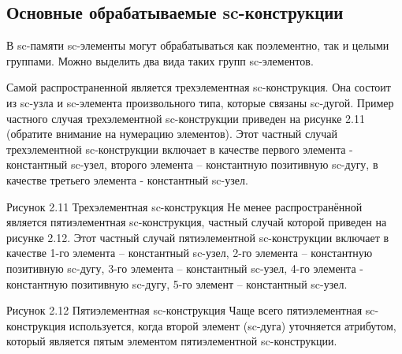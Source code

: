 \subsection{Основные обрабатываемые sc-конструкции}

В sc-памяти sc-элементы могут обрабатываться как поэлементно, так и
целыми группами. Можно выделить два вида таких групп sc-элементов.

Самой распространенной является трехэлементная sc-конструкция. Она
состоит из sc-узла и sc-элемента произвольного типа, которые связаны
sc-дугой. Пример частного случая трехэлементной sc-конструкции
приведен на рисунке 2.11 (обратите внимание на нумерацию
элементов). Этот частный случай трехэлементной sc-конструкции включает
в качестве первого элемента - константный sc-узел, второго элемента –
константную позитивную sc-дугу, в качестве третьего элемента -
константный sc-узел.

Рисунок 2.11 Трехэлементная sc-конструкция Не менее распространённой
является пятиэлементная sc-конструкция, частный случай которой
приведен на рисунке 2.12. Этот частный случай пятиэлементной
sc-конструкции включает в качестве 1-го элемента – константный
sc-узел, 2-го элемента – константную позитивную sc-дугу, 3-го элемента
– константный sc-узел, 4-го элемента - константную позитивную sc-дугу,
5-го элемент – константный sc-узел.

 
Рисунок 2.12 Пятиэлементная sc-конструкция
Чаще всего пятиэлементная sc-конструкция используется, когда второй элемент (sc-дуга) уточняется атрибутом, который является пятым элементом пятиэлементной sc-конструкции.



